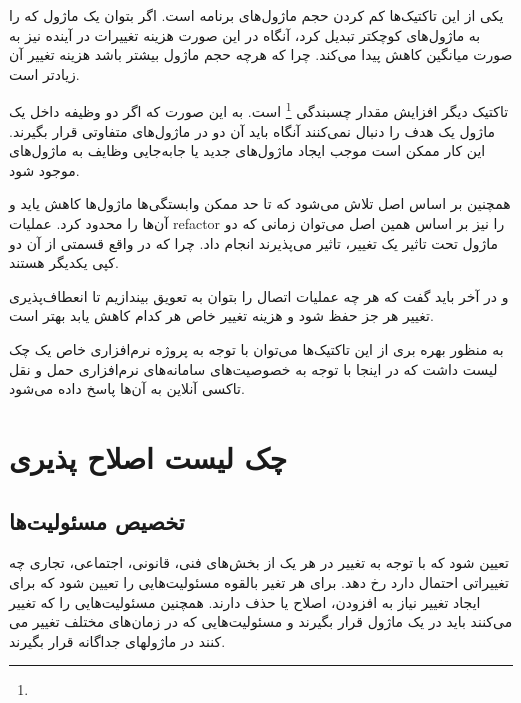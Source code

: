 یکی از این تاکتیک‌ها کم کردن حجم ماژول‌های برنامه است. اگر بتوان یک ماژول که را به ماژول‌های کوچکتر تبدیل کرد، آنگاه در این صورت هزینه تغییرات در آینده نیز به صورت میانگین کاهش پیدا می‌کند.
چرا که هرچه حجم ماژول بیشتر باشد هزینه تغییر آن زیادتر است.

تاکتیک دیگر افزایش مقدار چسبندگی
\footnote{}
است. به این صورت که اگر دو وظیفه داخل یک ماژول یک هدف را دنبال نمی‌کنند آنگاه باید آن دو در ماژول‌های متفاوتی قرار بگیرند.
این کار ممکن است موجب ایجاد ماژول‌های جدید یا جابه‌جایی وظایف به ماژول‌های موجود شود.

همچنین بر اساس اصل  تلاش می‌شود که تا حد ممکن وابستگی‌ها ماژول‌ها کاهش یاید و آن‌ها را محدود کرد. عملیات refactor را نیز بر اساس همین اصل می‌توان زمانی که دو ماژول تحت تاثیر یک تغییر، تاثیر می‌پذیرند انجام داد. چرا که در واقع قسمتی از آن دو کپی یکدیگر هستند.

و در آخر باید گفت که هر چه عملیات اتصال را بتوان به تعویق بیندازیم تا انعطاف‌پذیری تغییر هر جز حفظ شود و هزینه تغییر خاص هر کدام کاهش یابد بهتر است.


به منظور بهره بری از این تاکتیک‌ها می‌توان با توجه به پروژه نرم‌افزاری خاص یک چک لیست داشت که در اینجا با توجه به خصوصیت‌های سامانه‌های نرم‌افزاری حمل و نقل تاکسی آنلاین به آن‌ها پاسخ داده می‌شود.

\section{چک لیست اصلاح پذیری}

\subsection{تخصیص مسئولیت‌ها}
تعیین شود که با توجه به تغییر در هر یک از بخش‌های فنی، قانونی، اجتماعی، تجاری چه تغییراتی احتمال دارد رخ دهد. برای هر تغیر بالقوه مسئولیت‌هایی را تعیین شود 
که برای ایجاد تغییر نیاز به افزودن، اصلاح یا حذف دارند.
همچنین مسئولیت‌هایی را که تغییر می‌کنند باید در یک ماژول قرار بگیرند و مسئولیت‌هایی که در زمان‌های مختلف تغییر می کنند در ماژولهای جداگانه قرار بگیرند.
